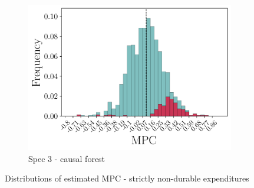 \begin{figure}[t]
\begin{subfigure}{0.33\linewidth}
        \includegraphics[width=\linewidth]{figures/distributions/spec3_cf_chSNDexp.png}
        \caption{Spec 3 - causal forest}
    \end{subfigure}\hfill
    \caption{Distributions of estimated MPC - strictly non-durable expenditures}
    \label{fig:dist_snd}
\end{figure}
